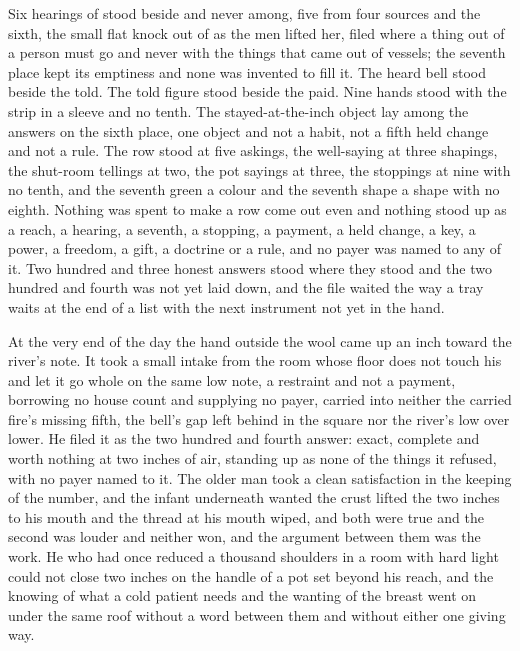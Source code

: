 Six hearings of  stood beside and never among, five from four sources and the sixth, the small flat knock out of  as the men lifted her, filed where a thing out of a person must go and never with the things that came out of vessels; the seventh place kept its emptiness and none was invented to fill it. The heard bell stood beside the told. The told figure stood beside the paid. Nine hands stood with the strip in a sleeve and no tenth. The stayed-at-the-inch object lay among the answers on the sixth place, one object and not a habit, not a fifth held change and not a rule. The row stood at five askings, the well-saying at three shapings, the shut-room tellings at two, the pot sayings at three, the stoppings at nine with no tenth, and the seventh green a colour and the seventh shape a shape with no eighth. Nothing was spent to make a row come out even and nothing stood up as a reach, a hearing, a seventh, a stopping, a payment, a held change, a key, a power, a freedom, a gift, a doctrine or a rule, and no payer was named to any of it. Two hundred and three honest answers stood where they stood and the two hundred and fourth was not yet laid down, and the file waited the way a tray waits at the end of a list with the next instrument not yet in the hand.

At the very end of the day the hand outside the wool came up an inch toward the river's note. It took a small intake from the room whose floor does not touch his and let it go whole on the same low note, a restraint and not a payment, borrowing no house count and supplying no payer, carried into neither the carried fire's missing fifth, the bell's gap left behind in the square nor the river's low over lower. He filed it as the two hundred and fourth answer: exact, complete and worth nothing at two inches of air, standing up as none of the things it refused, with no payer named to it. The older man took a clean satisfaction in the keeping of the number, and the infant underneath wanted the crust lifted the two inches to his mouth and the thread at his mouth wiped, and both were true and the second was louder and neither won, and the argument between them was the work. He who had once reduced a thousand shoulders in a room with hard light could not close two inches on the handle of a pot set beyond his reach, and the knowing of what a cold patient needs and the wanting of the breast went on under the same roof without a word between them and without either one giving way.

